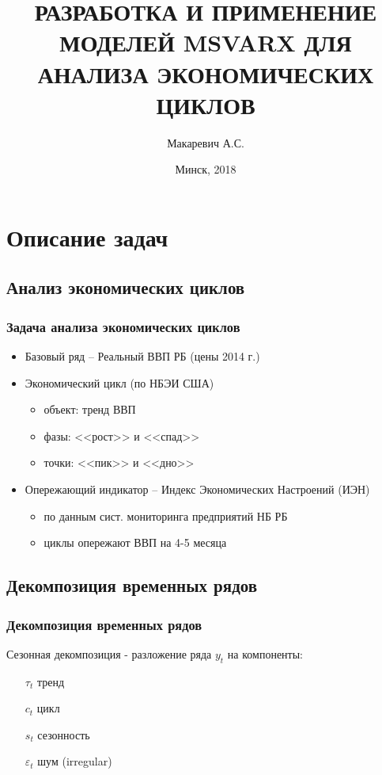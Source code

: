 \documentclass{beamer}
\title{РАЗРАБОТКА И ПРИМЕНЕНИЕ МОДЕЛЕЙ MSVARX ДЛЯ АНАЛИЗА ЭКОНОМИЧЕСКИХ ЦИКЛОВ}
\author{Макаревич А.С.}
\institute[БГУ]{Белорусский Государственный Университет}
\date[Минск, 2018]{Минск, 2018}
\begin{document}
	\begin{frame}
		\titlepage
	\end{frame}

	\section{Описание задач}
		\subsection{Анализ экономических циклов}
		\begin{frame}
			\frametitle{Задача анализа экономических циклов}
			
			\begin{itemize}
				\item Базовый ряд -- Реальный ВВП РБ (цены 2014 г.)
				\item Экономический цикл (по НБЭИ США)
					\begin{itemize}
						\item объект: тренд ВВП
						\item фазы: <<рост>> и <<спад>>
						\item точки: <<пик>> и <<дно>>
					\end{itemize}
				\pause
				\item Опережающий индикатор -- Индекс Экономических Настроений (ИЭН)
					\begin{itemize}
						\item по данным сист. мониторинга предприятий НБ РБ
						\item циклы опережают ВВП на 4-5 месяца
					\end{itemize}
			\end{itemize}
			
		\end{frame}

		\subsection{Декомпозиция временных рядов}
		\begin{frame}
			\frametitle{Декомпозиция временных рядов}
			
			Сезонная декомпозиция - разложение ряда $y_t$ на компоненты:
			\begin{itemize}
				\item[$\tau_t$] тренд 
				\item[$c_t$] цикл 
				\item[$s_t$] сезонность 
				\item[$\varepsilon_t$] шум (irregular) 
			\end{itemize}			
		\end{frame}
	
\end{document}
